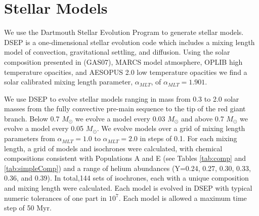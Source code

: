 \section{Stellar Models}\label{sec:2808modeling}
We use the Dartmouth Stellar Evolution Program \citep[DSEP, ][]{Dotter2008} to
generate stellar models. DSEP is a one-dimensional stellar
evolution code which includes a mixing length model of convection,
gravitational settling, and diffusion. Using the solar composition presented in
\citep{Grevesse2007} (GAS07), MARCS model atmosphere, OPLIB high temperature
opacities, and AESOPUS 2.0 low temperature opacities we find a solar calibrated
mixing length parameter, $\alpha_{MLT}$, of $\alpha_{MLT} = 1.901$.

We use DSEP to evolve stellar models ranging in mass from 0.3 to 2.0 solar
masses from the fully convective pre-main sequence to the tip of the red giant
branch. Below 0.7 $M_{\odot}$ we evolve a model every 0.03 $M_{\odot}$ and
above 0.7 $M_{\odot}$ we evolve a model every 0.05 $M_{\odot}$. We evolve
models over a grid of mixing length parameters from $\alpha_{MLT} = 1.0$ to
$\alpha_{MLT} = 2.0$ in steps of 0.1. For each mixing length, a grid of models
and isochrones were calculated, with chemical compositions consistent with
Populations A and E (see Tables \ref{tab:comp} and \ref{tab:simpleComp}) and a
range of helium abundances (Y=0.24, 0.27, 0.30, 0.33, 0.36, and 0.39). In
total,144 sets of isochrones, each with a unique composition and mixing length
were calculated. Each model is evolved in DSEP with typical numeric tolerances
of one part in $10^{7}$. Each model is allowed a maximum time step of 50 Myr. 

